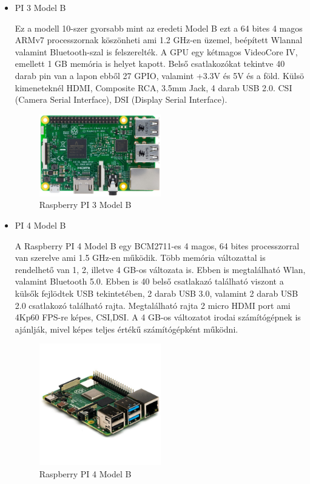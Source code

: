 \documentclass[a4paper,12pt,oneside]{report}
\begin{document}
\begin{itemize}
	\item{PI 3 Model B}

	Ez a modell 10-szer gyorsabb mint az eredeti Model B ezt a 64 bites 4 magos ARMv7 processzornak köszönheti ami 1.2 GHz-en üzemel,
	beépített Wlannal valamint Bluetooth-szal is felszerelték. A GPU egy kétmagos VideoCore IV, emellett 1 GB memória is helyet kapott.
	Belső csatlakozókat tekintve 40 darab pin van a lapon ebből 27 GPIO, valamint +3.3V és 5V és a föld.
	Külsö kimeneteknél HDMI, Composite RCA, 3.5mm Jack, 4 darab USB 2.0. CSI (Camera Serial Interface), DSI (Display Serial Interface).
	\begin{figure}[htbp]
		\centering
		\includegraphics[width=0.5\textwidth]{fig/3b.png}
		\caption{Raspberry PI 3 Model B}
		\label{fig-3b}
	\end{figure}
		
	\item{PI 4 Model B}

	A Raspberry PI 4 Model B egy BCM2711-es 4 magos, 64 bites processzorral van szerelve ami 1.5 GHz-en működik. Több memória változattal
	is rendelhető van 1, 2, illetve 4 GB-os változata is. Ebben is megtalálható Wlan, valamint Bluetooth 5.0. Ebben is 40 belső 
	csatlakazó található viszont a külsők fejlödtek USB tekintetében, 2 darab USB 3.0, valamint 2 darab USB 2.0 csatlakozó található
	rajta. 
	Megtalálható rajta 2 micro HDMI port ami 4Kp60 FPS-re képes, CSI,DSI.
	A 4 GB-os változatot irodai számítógépnek is ajánlják, mivel képes teljes értékű számítógépként működni.
	\begin{figure}[htbp]
		\centering
		\includegraphics[width=0.5\textwidth]{fig/4b.png}
		\caption{Raspberry PI 4 Model B}
		\label{fig-4b}
	\end{figure}
		

\end{itemize}
\end{document}
